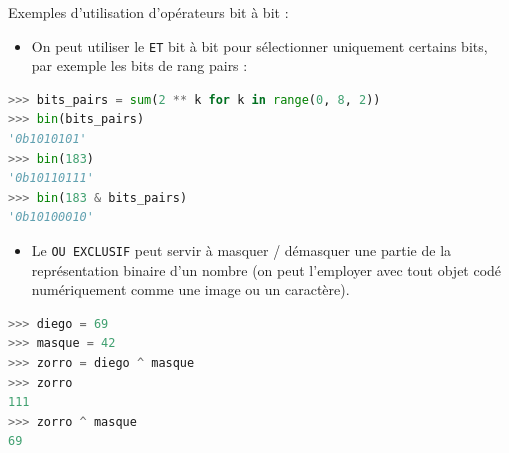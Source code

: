 \documentclass[
  11pt,
]{article}
\newcommand{\passthrough}[1]{#1}
\providecommand{\tightlist}{%
  \setlength{\itemsep}{0pt}\setlength{\parskip}{0pt}}
\begin{document}
Exemples d'utilisation d'opérateurs bit à bit :

\begin{itemize}
\tightlist
\item
  On peut utiliser le \passthrough{\lstinline!ET!} bit à bit pour
  sélectionner uniquement certains bits, par exemple les bits de rang
  pairs :
\end{itemize}

\begin{lstlisting}[language=Python]
>>> bits_pairs = sum(2 ** k for k in range(0, 8, 2))
>>> bin(bits_pairs)
'0b1010101'
>>> bin(183)
'0b10110111'
>>> bin(183 & bits_pairs)
'0b10100010'
\end{lstlisting}

\begin{itemize}
\tightlist
\item
  Le \passthrough{\lstinline!OU EXCLUSIF!} peut servir à masquer /
  démasquer une partie de la représentation binaire d'un nombre (on peut
  l'employer avec tout objet codé numériquement comme une image ou un
  caractère).
\end{itemize}

\begin{lstlisting}[language=Python]
>>> diego = 69
>>> masque = 42
>>> zorro = diego ^ masque
>>> zorro
111
>>> zorro ^ masque
69
\end{lstlisting}
\end{document}
